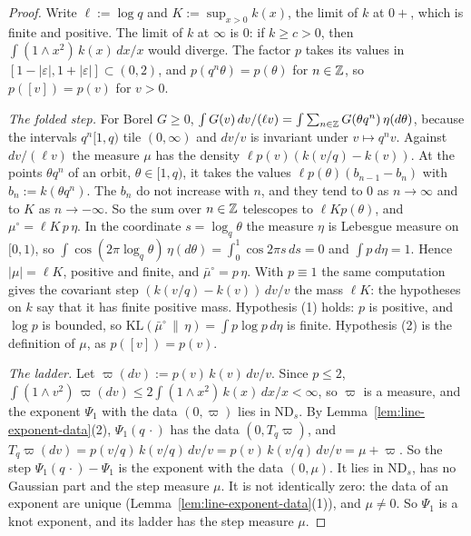 \begin{proof}
Write $\ell := \log q$ and $K := \sup_{x > 0}k(x)$, the limit of $k$ at $0{+}$, which is finite
and positive. The limit of $k$ at $\infty$ is $0$: if $k \ge c > 0$, then
$\int(1 \wedge x^2)\,k(x)\,dx/x$ would diverge. The factor $p$ takes its values in
$[1 - |\varepsilon|, 1 + |\varepsilon|] \subset (0, 2)$, and $p(q^n\theta) = p(\theta)$ for
$n \in \mathbb{Z}$, so $p([v]) = p(v)$ for $v > 0$.

\emph{The folded step.} For Borel $G \ge 0$,
$\int G(v)\,dv/(\ell v) = \int\sum_{n \in \mathbb{Z}}G(\theta q^n)\,\eta(d\theta)$, because the intervals
$q^n[1,q)$ tile $(0,\infty)$ and $dv/v$ is invariant under $v \mapsto q^nv$. Against $dv/(\ell v)$
the measure $\mu$ has the density $\ell p(v)(k(v/q) - k(v))$. At the points $\theta q^n$ of an
orbit, $\theta \in [1,q)$, it takes the values $\ell p(\theta)(b_{n-1} - b_n)$ with
$b_n := k(\theta q^n)$. The $b_n$ do not increase with $n$, and they tend to $0$ as $n \to \infty$
and to $K$ as $n \to -\infty$. So the sum over $n \in \mathbb{Z}$ telescopes to $\ell Kp(\theta)$, and
$\mu^\circ = \ell K\,p\,\eta$. In the coordinate $s = \log_q\theta$ the measure $\eta$ is Lebesgue
measure on $[0,1)$, so $\int\cos(2\pi\log_q\theta)\,\eta(d\theta) = \int_0^1\cos 2\pi s\,ds = 0$
and $\int p\,d\eta = 1$. Hence $|\mu| = \ell K$, positive and finite, and $\bar\mu^\circ = p\,\eta$.
With $p \equiv 1$ the same computation gives the covariant step $(k(v/q) - k(v))\,dv/v$ the mass
$\ell K$: the hypotheses on $k$ say that it has finite positive mass. Hypothesis (1) holds: $p$ is
positive, and $\log p$ is bounded, so $\mathrm{KL}(\bar\mu^\circ \,\|\, \eta) = \int p\log p\,d\eta$
is finite. Hypothesis (2) is the definition of $\mu$, as $p([v]) = p(v)$.

\emph{The ladder.} Let $\varpi(dv) := p(v)\,k(v)\,dv/v$. Since $p \le 2$,
$\int(1 \wedge v^2)\,\varpi(dv) \le 2\int(1 \wedge x^2)\,k(x)\,dx/x < \infty$, so $\varpi$ is a
\Levy{} measure, and the exponent $\Psi_1$ with the data $(0, \varpi)$ lies in $\mathrm{ND}_s$. By
Lemma~\ref{lem:line-exponent-data}(2), $\Psi_1(q\,\cdot)$ has the data $(0, T_q\varpi)$, and
$T_q\varpi(dv) = p(v/q)\,k(v/q)\,dv/v = p(v)\,k(v/q)\,dv/v = \mu + \varpi$. So the step
$\Psi_1(q\,\cdot) - \Psi_1$ is the exponent with the data $(0, \mu)$. It lies in $\mathrm{ND}_s$,
has no Gaussian part and the step measure $\mu$. It is not identically zero: the data of an
exponent are unique (Lemma~\ref{lem:line-exponent-data}(1)), and $\mu \ne 0$. So $\Psi_1$ is a knot
exponent, and its ladder has the step measure $\mu$.


\end{proof}
